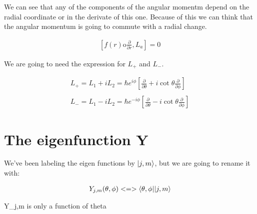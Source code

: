 We can see that any of the components of the angular momentm depend on the radial coordinate or in the derivate of this one. Because of this we can think that the angular momentum is going to commute with a radial change.

\begin{equation}
  \begin{array}{c}
    [f(r) \text{o} \frac{\partial}{\partial r},L_a] = 0
  \end{array}
\end{equation}

We are going to need the expression for $L_+$ and $L_-$.

\begin{equation}
  \begin{array}{c}
    L_+ = L_1 + iL_2 = \hbar e^{i\phi}\left[\frac{\partial}{\partial\theta}+i\cot\theta\frac{\partial}{\partial\phi}\right]
    \\

    \\
    L_- = L_1 - iL_2 = \hbar e^{-i\phi}\left[\frac{\partial}{\partial\theta}-i\cot\theta\frac{\partial}{\partial\phi}\right]
  \end{array}
\end{equation}

\section{The eigenfunction Y}

We've been labeling the eigen functions by $\lvert j,m\rangle$, but we are going to rename it with:

\begin{equation}
  \begin{array}{c}
    Y_{j,m}(\theta,\phi) <=> \langle\theta,\phi\rvert\lvert j,m\rangle
  \end{array}
\end{equation}

Y_{j,m} is only a function of theta 
